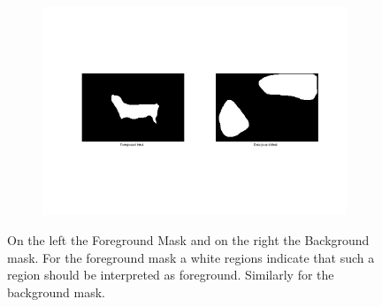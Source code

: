 \documentclass{paper}
\begin{document}
\begin{figure}[H]
    \centering
    \begin{subfigure}{1.0\textwidth}
        \includegraphics[width=\textwidth]{../../outputs/p4/image_segmentation/zebra/gamma20/masks}
    \end{subfigure}
    \caption{On the left the Foreground Mask and on the right the Background mask. For the foreground mask a white regions indicate that such a region should be interpreted as foreground. Similarly for the background mask.}
    \label{fig:segmentation_zebra_masks}       
\end{figure}
\end{document}
